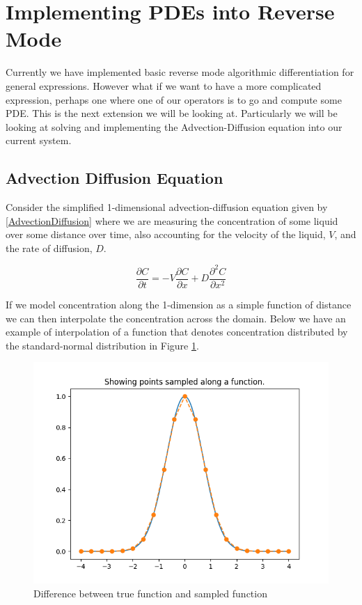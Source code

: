 \documentclass{article}
\begin{document}
\section{Implementing PDEs into Reverse Mode}

Currently we have implemented basic reverse mode algorithmic differentiation for general expressions. However what if we want to have a more complicated expression, perhaps one where one of our operators is to go and compute some PDE. This is the next extension we will be looking at. Particularly we will be looking at solving and implementing the Advection-Diffusion equation into our current system.

\subsection{Advection Diffusion Equation}

Consider the simplified 1-dimensional advection-diffusion equation \cite{AdvDiffPollutant} given by \eqref{AdvectionDiffusion} where we are measuring the concentration of some liquid over some distance over time, also accounting for the velocity of the liquid, $V$, and the rate of diffusion, $D$.

\begin{equation}
    \label{AdvectionDiffusion}
    \frac{\partial C}{\partial t} = - V\frac{\partial C}{\partial x} + D\frac{\partial^2 C}{\partial x^2}
\end{equation}

If we model concentration along the 1-dimension as a simple function of distance we can then interpolate the concentration across the domain. Below we have an example of interpolation of a function that denotes concentration distributed by the standard-normal distribution in Figure \ref{fig:sampling}.

\begin{figure}
\centering
    \includegraphics[width=12cm]{images/show_sampling.png}
    \caption{Difference between true function and sampled function}
    \label{fig:sampling}
\end{figure}
\end{document}
